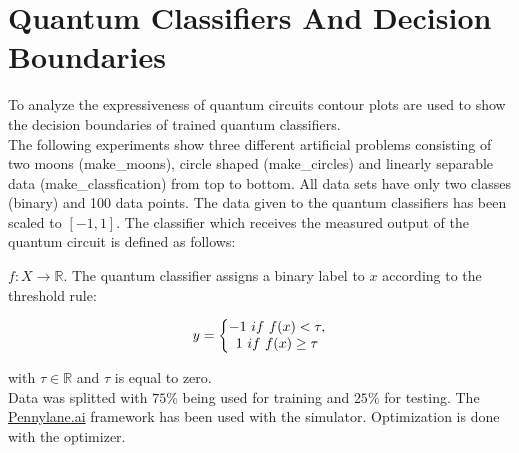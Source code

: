 
\chapter{Quantum Classifiers And Decision Boundaries} %

\label{chapter:quantum_classifiers_decision_boundaries}
To analyze the expressiveness of quantum circuits contour plots are used to show the decision boundaries of trained quantum classifiers.\\
The following experiments show three different artificial problems consisting of two moons (make\_moons), circle shaped (make\_circles) and linearly separable data (make\_classfication) from top to bottom. All data sets have only two classes (binary) and 100 data points. The data given to the quantum classifiers has been scaled to $\mathrm{[-1,1]}$. The classifier which receives the measured output of the quantum circuit is defined as follows:
\hfill \break

$f : X \rightarrow\mathbb{R}$. The quantum classifier assigns a binary label to $x$ according to the threshold rule:

\begin{equation}
    \centering
    \begin{split}
    y =
        \left\{\begin{matrix}
            -1\ if\ f(x) < \tau ,\\
            1\ if\ f(x) \geq \tau
        \end{matrix}\right.
    \end{split}
    \label{equation:classifier_definition}
\end{equation}

with $\tau\in\mathbb{R}$ and $\tau$ is equal to zero.\\
\hfill \break 
Data was splitted with $75\%$ being used for training and $25\%$ for testing. The \href{https://www.pennylane.ai}{Pennylane.ai} framework has been used with the \href{https://pennylane.readthedocs.io/en/stable/code/api/pennylane.devices.default_qubit.html#module-pennylane.devices.default_qubit}{} simulator. Optimization is done with the \href{https://pennylane.readthedocs.io/en/stable/code/api/pennylane.NesterovMomentumOptimizer.html}{} optimizer.

